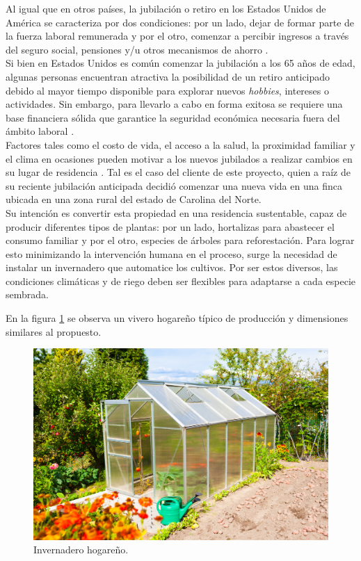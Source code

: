 Al igual que en otros países, la jubilación o retiro en los Estados Unidos de América se caracteriza por dos condiciones: por un lado, dejar de formar parte de la fuerza laboral remunerada y por el otro, comenzar a percibir ingresos a través del seguro social, pensiones y/u otros mecanismos de ahorro \citep{csreports:1}. \\
Si bien en Estados Unidos es común comenzar la jubilación a los 65 años de edad, algunas personas encuentran atractiva la posibilidad de un retiro anticipado debido al mayor tiempo disponible para explorar nuevos \textit{hobbies}, intereses o actividades. Sin embargo, para llevarlo a cabo en forma exitosa se requiere una base financiera sólida que garantice la seguridad económica necesaria fuera del ámbito laboral \citep{yahoo:1}. \\
Factores tales como el costo de vida, el acceso a la salud, la proximidad familiar y el clima en ocasiones pueden motivar a los nuevos jubilados a realizar cambios en su lugar de residencia  \citep{RelocatingAfterRetiring} \citep{Kim2021}. Tal es el caso del cliente de este proyecto, quien a raíz de su reciente jubilación anticipada decidió comenzar una nueva vida en una finca ubicada en una zona rural del estado de Carolina del Norte. \\
Su intención es convertir esta propiedad en una residencia sustentable, capaz de producir diferentes tipos de plantas: por un lado, hortalizas para abastecer el consumo familiar y por el otro, especies de árboles para reforestación.  
Para lograr esto minimizando la intervención humana en el proceso, surge la necesidad de instalar un invernadero que automatice los cultivos. Por ser estos diversos, las condiciones climáticas y de riego deben ser flexibles para adaptarse a cada especie sembrada. 


 
En la figura \ref{fig:imgInvernadero} se observa un vivero hogareño típico de producción y dimensiones similares al propuesto.




\begin{figure}[htpb]
\centering 
\includegraphics[width=.7\textwidth]{../Figures/invernadero1.jpg}
\caption{Invernadero hogareño\protect\footnotemark.}
\label{fig:imgInvernadero}
\end{figure}


